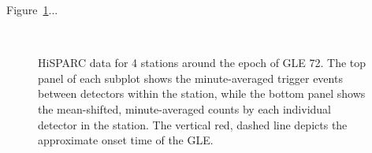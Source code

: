 Figure~\ref{fig:GLE_72}...

\begin{figure}[ht]
	\centering
	 \\
	
	\qquad
	
	
	\caption{HiSPARC data for 4 stations around the epoch of GLE 72. The top panel of each subplot shows the minute-averaged trigger events between detectors within the station, while the bottom panel shows the mean-shifted, minute-averaged counts by each individual detector in the station. The vertical red, dashed line depicts the approximate onset time of the GLE.}
	\label{fig:GLE_72}
\end{figure}

